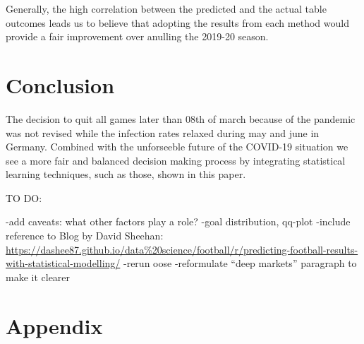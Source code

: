 \documentclass[12pt,a4paper]{article}
\begin{document}
Generally, the high correlation between the predicted and the actual
table outcomes leads us to believe that adopting the results from each
method would provide a fair improvement over anulling the 2019-20
season.





\hypertarget{conclusion}{%
\section{Conclusion}\label{conclusion}}

The decision to quit all games later than 08th of march because of the
pandemic was not revised while the infection rates relaxed during may
and june in Germany. Combined with the unforseeble future of the
COVID-19 situation we see a more fair and balanced decision making
process by integrating statistical learning techniques, such as those,
shown in this paper.

TO DO:

-add caveats: what other factors play a role? -goal distribution,
qq-plot -include reference to Blog by David Sheehan:
\url{https://dashee87.github.io/data\%20science/football/r/predicting-football-results-with-statistical-modelling/}
-rerun oose -reformulate \enquote{deep markets} paragraph to make it
clearer

\newpage

\printbibliography

\newpage

\hypertarget{appendix}{%
\section{Appendix}\label{appendix}}
\end{document}
